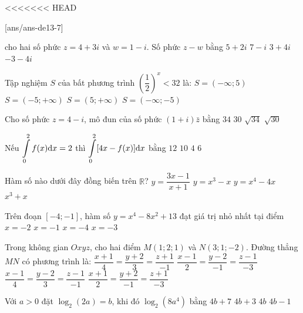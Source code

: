 <<<<<<< HEAD

\begin{name}
	{\tenchude}
	{\tendethi}
	{\tentruong}
	{\thoigian}
\end{name}
[ans/ans-de13-7]

\begin{ex}%
cho hai số phức $z=4+3 i$ và $w=1-i$. Số phức $z-w$ bằng
\choice
{$5+2 i$}
{$7-i$}
{\True $3+4 i$}
{$-3-4 i$}

\end{ex}
\begin{ex}%
Tập nghiệm $S$ của bất phương trình $\left(\dfrac{1}{2}\right)^{x}<32$ là:
\choice
{$S=(-\infty; 5)$}
{\True $S=(-5;+\infty)$}
{$S=(5;+\infty)$}
{$S=(-\infty;-5)$}

\end{ex}
\begin{ex}%
Cho số phức $z=4-i$, mô đun của số phức $(1+i) \bar{z}$ bằng
\choice
{$34$}
{$30$}
{\True $\sqrt{34}$}
{$\sqrt{30}$}

\end{ex}
\begin{ex}%
Nếu $\displaystyle\displaystyle\int\limits_0^2 f(x) \mathrm{d} x=2$ thì $\displaystyle\displaystyle\int\limits_0^2[4 x-f(x)] \mathrm{d} x$ bằng
\choice
{$12$}
{$10$}
{$4$}
{\True $6$}

\end{ex}
\begin{ex}%
Hàm số nào dưới đây đồng biến trên $\mathbb{R}$?
\choice
{$y=\dfrac{3 x-1}{x+1}$}
{$y=x^3-x$}
{$y=x^4-4 x$}
{\True $x^3+x$}

\end{ex}
\begin{ex}%
Trên đoạn $[-4;-1]$, hàm số $y=x^4-8 x^2+13$ đạt giá trị nhỏ nhất tại điểm
\choice
{\True $x=-2$}
{$x=-1$}
{$x=-4$}
{$x=-3$}

\end{ex}
\begin{ex}%
Trong không gian $O x y z$, cho hai điểm $M(1; 2; 1)$ và $N(3; 1;-2)$. Đường thẳng $MN$ có phương trình là:
\choice
{$\dfrac{x+1}{4}=\dfrac{y+2}{3}=\dfrac{z+1}{-1}$}
{\True $\dfrac{x-1}{2}=\dfrac{y-2}{-1}=\dfrac{z-1}{-3}$}
{$\dfrac{x-1}{4}=\dfrac{y-2}{3}=\dfrac{z-1}{-1}$}
{$\dfrac{x+1}{2}=\dfrac{y+2}{-1}=\dfrac{z+1}{-3}$}

\end{ex}
\begin{ex}%
Với $a>0$ đặt $\log_2(2 a)=b$, khi đó $\log_2\left(8 a^4\right)$ bằng
\choice
{$4 b+7$}
{$4 b+3$}
{$4 b$}
{\True $4 b-1$}

\end{ex}
